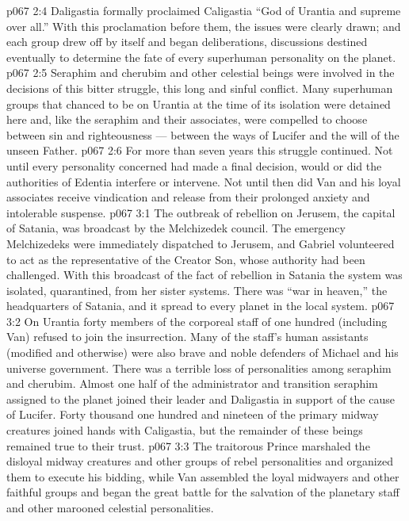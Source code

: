 \vs p067 2:4 \pc Daligastia formally proclaimed Caligastia “God of Urantia and supreme over all.” With this proclamation before them, the issues were clearly drawn; and each group drew off by itself and began deliberations, discussions destined eventually to determine the fate of every superhuman personality on the planet.
\vs p067 2:5 Seraphim and cherubim and other celestial beings were involved in the decisions of this bitter struggle, this long and sinful conflict. Many superhuman groups that chanced to be on Urantia at the time of its isolation were detained here and, like the seraphim and their associates, were compelled to choose between sin and righteousness --- between the ways of Lucifer and the will of the unseen Father.
\vs p067 2:6 For more than seven years this struggle continued. Not until every personality concerned had made a final decision, would or did the authorities of Edentia interfere or intervene. Not until then did Van and his loyal associates receive vindication and release from their prolonged anxiety and intolerable suspense.
\vs p067 3:1 The outbreak of rebellion on Jerusem, the capital of Satania, was broadcast by the Melchizedek council. The emergency Melchizedeks were immediately dispatched to Jerusem, and Gabriel volunteered to act as the representative of the Creator Son, whose authority had been challenged. With this broadcast of the fact of rebellion in Satania the system was isolated, quarantined, from her sister systems. There was “war in heaven,” the headquarters of Satania, and it spread to every planet in the local system.
\vs p067 3:2 On Urantia forty members of the corporeal staff of one hundred (including Van) refused to join the insurrection. Many of the staff’s human assistants (modified and otherwise) were also brave and noble defenders of Michael and his universe government. There was a terrible loss of personalities among seraphim and cherubim. Almost one half of the administrator and transition seraphim assigned to the planet joined their leader and Daligastia in support of the cause of Lucifer. Forty thousand one hundred and nineteen of the primary midway creatures joined hands with Caligastia, but the remainder of these beings remained true to their trust.
\vs p067 3:3 The traitorous Prince marshaled the disloyal midway creatures and other groups of rebel personalities and organized them to execute his bidding, while Van assembled the loyal midwayers and other faithful groups and began the great battle for the salvation of the planetary staff and other marooned celestial personalities.
